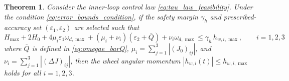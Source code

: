 \documentclass[journal]{new-aiaa}
\newtheorem{theorem}{Theorem}
\begin{document}
\begin{theorem}
\label{thm:feasibility_momentum}
Consider the inner-loop control law \eqref{eq:tau_law_feasibility}. Under the condition \eqref{eq:error_bounds_condition}, 
if the safety margin $\gamma_h$ and prescribed-accuracy set $(\varepsilon_1,\varepsilon_2)$ are selected such that
\begin{equation}
H_{\max} + 2H_0 + 4\mu_i\varepsilon_1\omega_{d,\max} + (\mu_i + \nu_i) (\varepsilon_2 + \bar Q) + \nu_i \omega_{d,\max}\le \gamma_h\, h_{w,i,\max},\qquad i=1,2,3
\label{eq:thm5_axis_condition}
\end{equation}
where $\bar Q$ is defined in \eqref{eq:omegae_barQ}, $\mu_i = \sum_{j=1}^{3}|(J_0)_{ij}|$, and $\nu_i = \sum_{j=1}^{3}|(\Delta J)_{ij}|$,
then the wheel angular momentum $|h_{w,i}(t)|\le h_{w,i,\max}$ holds for all $i=1,2,3$.
\end{theorem}
\end{document}
